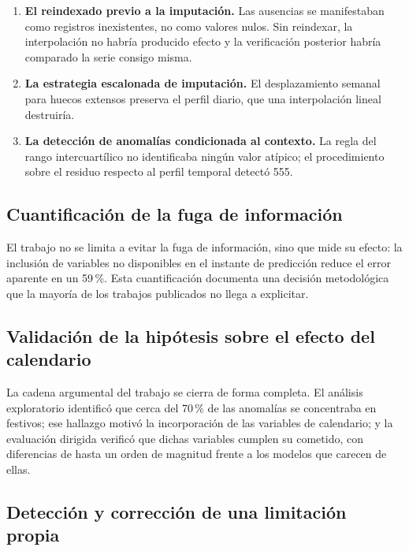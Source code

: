 \begin{enumerate}
  \item \textbf{El reindexado previo a la imputación.} Las ausencias se
        manifestaban como registros inexistentes, no como valores nulos. Sin
        reindexar, la interpolación no habría producido efecto y la verificación
        posterior habría comparado la serie consigo misma.

  \item \textbf{La estrategia escalonada de imputación.} El desplazamiento
        semanal para huecos extensos preserva el perfil diario, que una
        interpolación lineal destruiría.

  \item \textbf{La detección de anomalías condicionada al contexto.} La regla del
        rango intercuartílico no identificaba ningún valor atípico; el
        procedimiento sobre el residuo respecto al perfil temporal detectó 555.
\end{enumerate}

\subsection*{Cuantificación de la fuga de información}

El trabajo no se limita a evitar la fuga de información, sino que mide su efecto:
la inclusión de variables no disponibles en el instante de predicción reduce el
error aparente en un 59\,\%. Esta cuantificación documenta una decisión
metodológica que la mayoría de los trabajos publicados no llega a explicitar.

\subsection*{Validación de la hipótesis sobre el efecto del calendario}

La cadena argumental del trabajo se cierra de forma completa. El análisis
exploratorio identificó que cerca del 70\,\% de las anomalías se concentraba en
festivos; ese hallazgo motivó la incorporación de las variables de calendario; y
la evaluación dirigida verificó que dichas variables cumplen su cometido, con
diferencias de hasta un orden de magnitud frente a los modelos que carecen de
ellas.

\subsection*{Detección y corrección de una limitación propia}

